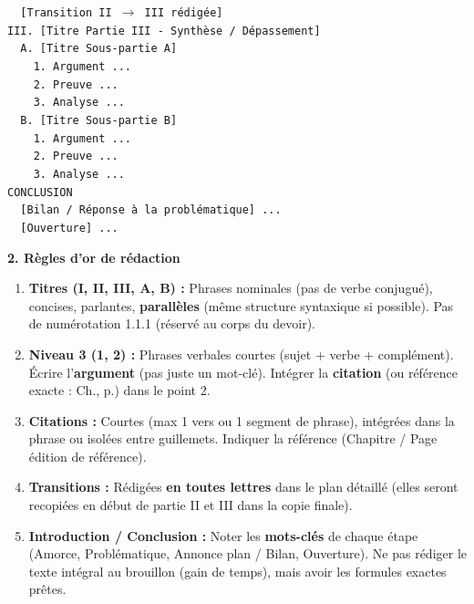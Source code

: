 \documentclass[11pt]{article}
\begin{document}
\begin{methode}
\begin{flushleft}
\texttt{\ \ [Transition II $\to$ III rédigée]}\\
\texttt{III. [Titre Partie III - Synthèse / Dépassement]}\\
\texttt{\ \ A. [Titre Sous-partie A]}\\
\texttt{\ \ \ \ 1. Argument ...}\\
\texttt{\ \ \ \ 2. Preuve ...}\\
\texttt{\ \ \ \ 3. Analyse ...}\\
\texttt{\ \ B. [Titre Sous-partie B]}\\
\texttt{\ \ \ \ 1. Argument ...}\\
\texttt{\ \ \ \ 2. Preuve ...}\\
\texttt{\ \ \ \ 3. Analyse ...}\\
\texttt{CONCLUSION}\\
\texttt{\ \ [Bilan / Réponse à la problématique] ...}\\
\texttt{\ \ [Ouverture] ...}
\end{flushleft}

\textbf{2. Règles d'or de rédaction}
\begin{enumerate}
    \item \textbf{Titres (I, II, III, A, B) :} Phrases nominales (pas de verbe conjugué), concises, parlantes, \textbf{parallèles} (même structure syntaxique si possible). Pas de numérotation 1.1.1 (réservé au corps du devoir).
    \item \textbf{Niveau 3 (1, 2) :} Phrases verbales courtes (sujet + verbe + complément). Écrire l'\textbf{argument} (pas juste un mot-clé). Intégrer la \textbf{citation} (ou référence exacte : Ch., p.) dans le point 2.
    \item \textbf{Citations :} Courtes (max 1 vers ou 1 segment de phrase), intégrées dans la phrase ou isolées entre guillemets. Indiquer la référence (Chapitre / Page édition de référence).
    \item \textbf{Transitions :} Rédigées \textbf{en toutes lettres} dans le plan détaillé (elles seront recopiées en début de partie II et III dans la copie finale).
    \item \textbf{Introduction / Conclusion :} Noter les \textbf{mots-clés} de chaque étape (Amorce, Problématique, Annonce plan / Bilan, Ouverture). Ne pas rédiger le texte intégral au brouillon (gain de temps), mais avoir les formules exactes prêtes.
\end{enumerate}


\end{methode}
\end{document}
